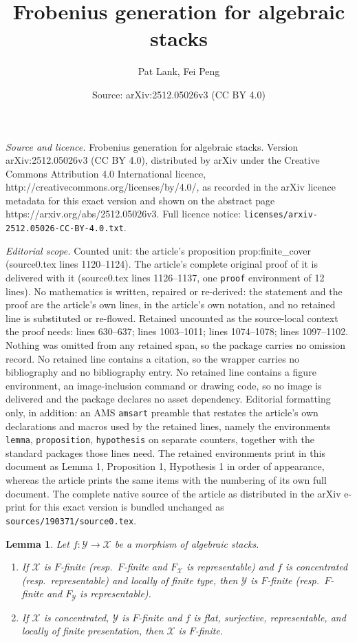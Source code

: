 \documentclass[10pt,a4paper]{amsart}
\title{Frobenius generation for algebraic stacks}
\author{Pat Lank, Fei Peng}
\date{Source: arXiv:2512.05026v3 (CC BY 4.0)}
\newtheorem{lemma}{Lemma}
\begin{document}
\maketitle

\noindent\emph{Source and licence.} Frobenius generation for algebraic stacks. Version arXiv:2512.05026v3 (CC BY 4.0), distributed by arXiv under the Creative Commons Attribution 4.0 International licence, http://creativecommons.org/licenses/by/4.0/, as recorded in the arXiv licence metadata for this exact version and shown on the abstract page https://arxiv.org/abs/2512.05026v3. Full licence notice: \texttt{licenses/arxiv-2512.05026-CC-BY-4.0.txt}.\par\smallskip

\noindent\textit{Editorial scope.} Counted unit: the article's proposition prop:finite\_cover (source0.tex lines 1120--1124). The article's complete original proof of it is delivered with it (source0.tex lines 1126--1137, one \texttt{proof} environment of 12 lines). No mathematics is written, repaired or re-derived: the statement and the proof are the article's own lines, in the article's own notation, and no retained line is substituted or re-flowed.  Retained uncounted as the source-local context the proof needs: lines 630--637; lines 1003--1011; lines 1074--1078; lines 1097--1102.  Nothing was omitted from any retained span, so the package carries no omission record.  No retained line contains a citation, so the wrapper carries no bibliography and no bibliography entry.  No retained line contains a figure environment, an image-inclusion command or drawing code, so no image is delivered and the package declares no asset dependency.  Editorial formatting only, in addition: an AMS \texttt{amsart} preamble that restates the article's own declarations and macros used by the retained lines, namely the environments \texttt{lemma}, \texttt{proposition}, \texttt{hypothesis} on separate counters, together with the standard packages those lines need.  The retained environments print in this document as Lemma 1, Proposition 1, Hypothesis 1 in order of appearance, whereas the article prints the same items with the numbering of its own full document.  The complete native source of the article as distributed in the arXiv e-print for this exact version is bundled unchanged as \texttt{sources/190371/source0.tex}.
\begin{lemma}
    \label{lem:F-finiteness_ascent_descent}
    Let $f\colon\mathcal{Y}\to\mathcal{X}$ be a morphism of algebraic stacks.
    \begin{enumerate}
        \item If $\mathcal{X}$ is $F$-finite (resp.\ $F$-finite and $F_\mathcal{X}$ is representable) and $f$ is concentrated (resp.\ representable) and locally of finite type, then $\mathcal{Y}$ is $F$-finite (resp.\ $F$-finite and $F_\mathcal{Y}$ is representable).
        \item If $\mathcal{X}$ is concentrated, $\mathcal{Y}$ is $F$-finite and $f$ is flat, surjective, representable, and locally of finite presentation, then $\mathcal{X}$ is $F$-finite.
    \end{enumerate}
\end{lemma}
\end{document}
